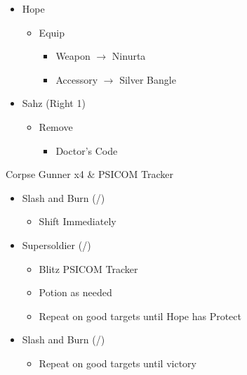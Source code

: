 \documentclass{report}
\begin{document}
\begin{menu}
\begin{itemize}
    \equip
    \begin{itemize}
        \item Hope
        \begin{itemize}
            \item Equip
            \begin{itemize}
                \item Weapon $\rightarrow$ Ninurta
                \item Accessory $\rightarrow$ Silver Bangle
            \end{itemize}
        \end{itemize}
        \item Sahz (Right 1)
        \begin{itemize}
            \item Remove
            \begin{itemize}
                \item Doctor's Code
            \end{itemize}
        \end{itemize}
    \end{itemize}
\end{itemize}
\end{menu}

\renewcommand{\first}{[1] Slash and Burn (\com/\rav)}
\renewcommand{\second}{[2] Supersoldier (\com/\syn)}

\begin{battle}{Corpse Gunner x4 \& PSICOM Tracker}
\begin{itemize}
    \item \first
    \begin{itemize}
        \item Shift Immediately
    \end{itemize}
    \item \second
    \begin{itemize}
        \item Blitz PSICOM Tracker
        \item Potion as needed
        \item Repeat on good targets until Hope has Protect
    \end{itemize}
    \item \first
    \begin{itemize}
        \item Repeat on good targets until victory
    \end{itemize}
\end{itemize}
 
\end{battle}
\end{document}

